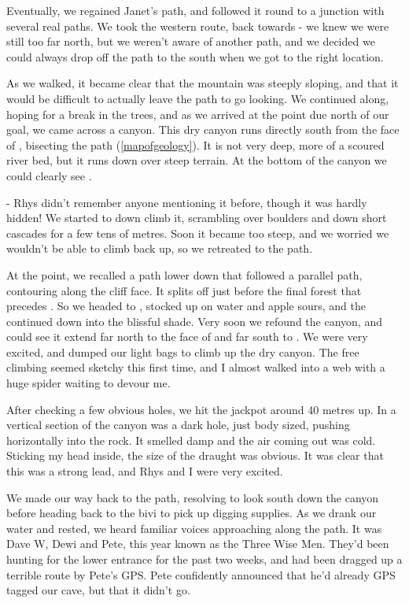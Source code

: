     Eventually, we regained Janet's path, and followed it round to a junction with several real paths. We took the western route, back towards  - we knew we were still too far north, but we weren't aware of another path, and we decided we could always drop off the path to the south when we got to the right location.

    As we walked, it became clear that the mountain was steeply sloping, and that it would be difficult to actually leave the path to go looking. We continued along, hoping for a break in the trees, and as we arrived at the point due north of our goal, we came across a canyon. This dry canyon runs directly south from the face of ,  bisecting the path (\vref{mapofgeology}). It is not very deep, more of a scoured river bed, but it runs down over steep terrain. At the bottom of the canyon we could clearly see .

	 - Rhys didn't remember anyone mentioning it before, though it was hardly hidden! We started to down climb it, scrambling over boulders and down short cascades for a few tens of metres. Soon it became too steep, and we worried we wouldn't be able to climb back up, so we retreated to the path.

    At the point, we recalled a path lower down that followed a parallel path, contouring along the cliff face. It splits off just before the final forest that precedes . So we headed to , stocked up on water and apple sours, and the continued down into the blissful shade. Very soon we refound the canyon, and could see it extend far north to the face of  and far south to . We were very excited, and dumped our light bags to climb up the dry canyon. The free climbing seemed sketchy this first time, and I almost walked into a web with a huge spider waiting to devour me.

    After checking a few obvious holes, we hit the jackpot around 40 metres up. In a vertical section of the canyon was a dark hole, just body sized, pushing horizontally into the rock. It smelled damp and the air coming out was cold. Sticking my head inside, the size of the draught was obvious. It was clear that this was a strong lead, and Rhys and I were very excited.

    We made our way back to the path, resolving to look south down the canyon before heading back to the bivi to pick up digging supplies. As we drank our water and rested, we heard familiar voices approaching along the path. It was Dave W, Dewi and Pete, this year known as the Three Wise Men. They'd been hunting for the lower entrance for the past two weeks, and had been dragged up a terrible route by Pete's GPS. Pete confidently announced that he'd already GPS tagged our cave, but that it didn't go.


